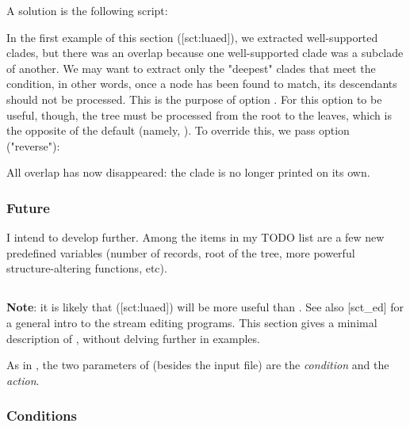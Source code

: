 
A solution is the following \luaed{} script:




In the first example of this section (\in{}[sct:luaed]), we extracted
well-supported clades, but there was an overlap because one well-supported clade
was a subclade of another. We may want to extract only the "deepest" clades that
meet the condition, in other words, once a node has been found to match, its
descendants should not be processed. This is the purpose of option .
For this option to be useful, though, the tree must be processed from the root
to the leaves, which is the opposite of the default (namely, \no). To override
this, we pass option  ("reverse"):


All overlap has now disappeared: the
 clade is no longer printed on its own. 

\subsubsection{Future}

I intend to develop \luaed{} further. Among the items in my TODO list are a few
new predefined variables (number of records, root of the tree, more powerful
structure-altering functions, etc).

%

\subsection{\ed}

{\bf Note}: it is likely that \luaed{} (\in{}[sct:luaed]) will be more useful
than \ed. See also [sct_ed] for a general intro to the stream
editing programs. This section gives a minimal description of \ed, without
delving further in examples.

As in \luaed, the two parameters of \ed{} (besides the input file) are the
{\it condition} and the {\it action}. 

\subsubsection{Conditions}

